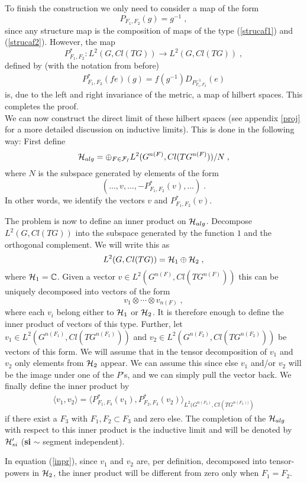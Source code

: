 \documentclass[12pt]{article}
\newcommand{\ba}{\begin{eqnarray}}
\newcommand{\ea}{\end{eqnarray}}
\def\cf{{\cal F}}
\def\ch{{\cal H}}
\newcommand{\bbC}{{\Bbb C}}
\begin{document}
To finish the construction we only need to consider a map of the form 
\begin{equation}
P_{F_1,F_2}(g)=g^{-1}
\label{strucaf2}\;,
\end{equation}
since any structure map is the composition of maps of the type (\ref{strucaf1}) and (\ref{strucaf2}).
However, the map
$$P_{F_1,F_2}^* :L^2(G,Cl(TG)) \to L^2(G,Cl(TG))\;,$$
defined by (with the notation from before)
\ba
P_{F_1,F_2}^* (fe)(g)=f(g^{-1})D_{P_{F_1,F_2}^{-1}}(e)
\nonumber
\ea
is, due to the left and right invariance of the metric, a map of hilbert
spaces. This completes the proof.\\
 

We can now construct the direct limit of these hilbert spaces (see appendix
\ref{proj} for a more detailed discussion on inductive limits). This is done in the following way: 
First define 
$$\ch_{alg}=\oplus_{F\in \cf_I}L^2 (G^{n(F)},Cl(TG^{n(F)}))/N\;, $$ 
where $N$ is the subspace generated by elements of the form 
$$(\ldots , v, \ldots , -P^*_{F_1,F_2}(v),\ldots )\;.$$ In other words, we
identify the vectors $v$ and $P^*_{F_1,F_2}(v)$.

The problem is now to define an inner product on $\ch_{alg}$. Decompose
$L^2(G,Cl(TG))$ into the subspace generated by the function $1$ and the
orthogonal complement. We will write this as 
$$L^2(G,Cl(TG))=\ch_1\oplus\ch_2\;,$$
where $\ch_1=\bbC$. Given a vector $v\in L^2(G^{n(F)},Cl(TG^{n(F)}))$ this can be uniquely
decomposed into vectors of the form 
\[
v_1\otimes\cdots\otimes v_{n(F)}\;,
\]
where each $v_i$ belong either to $\ch_1$ or $\ch_2$. It is therefore enough
to define the inner product of vectors of this type. Further, let $v_1\in
L^2(G^{n(F_1)},Cl(TG^{n(F_1)}))$ and $v_2\in
L^2(G^{n(F_2)},Cl(TG^{n(F_2)}))$ be vectors of this form. We will assume that
in the tensor decomposition of $v_1$ and $v_2$ only elements from
$\ch_2$ appear. We can assume this since else  $v_1$ and/or $v_2$ will be the image under
one of the $P$'s, and we can simply pull the vector back. We finally define the
inner product by
\ba
\langle v_1,v_2\rangle = \langle P_{F_1,F_3}^*
(v_1),P_{F_2,F_3}^*(v_2)\rangle_{L^2(G^{n(F_3)},Cl(TG^{n(F_3))})}
\label{inpr}
\ea  
if there exist a $F_3$ with $F_1,F_2 \subset F_3$ and zero else. The
completion of the $\ch_{alg}$ with respect to this inner product is the
inductive limit and will be denoted by $\ch'_{si}$ ({\bf si} $\sim$ segment independent).  

In equation (\ref{inpr}), since $v_1$ and $v_2$ are, per definition, decomposed into
tensor-powers in $\ch_2$, the inner product will be different from zero only when $F_1=F_2$. 
\end{document}
